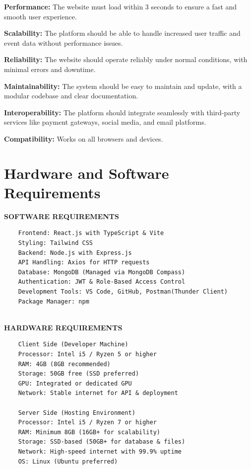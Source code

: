 \documentclass[twoside,a4paper,openright]{report} %
\begin{document}
\vspace{0.5cm} %

\textbf{Performance:} The website must load within 3 seconds to ensure a fast and smooth user         experience. 

\textbf{Scalability:} The platform should be able to handle increased user traffic and event data without
performance issues.

\textbf{Reliability:} The website should operate reliably under normal conditions, with minimal errors      and downtime. 

\textbf{Maintainability:} The system should be easy to maintain and update, with a modular codebase
and clear documentation.

\textbf{Interoperability:} The platform should integrate seamlessly with third-party services like payment
gateways, social media, and email platforms.

\textbf{Compatibility:} Works on all browsers and devices.


\section{Hardware and Software Requirements}
\textbf{SOFTWARE REQUIREMENTS}

\begin{verbatim}
	Frontend: React.js with TypeScript & Vite 
	Styling: Tailwind CSS 
	Backend: Node.js with Express.js 
	API Handling: Axios for HTTP requests
	Database: MongoDB (Managed via MongoDB Compass) 
	Authentication: JWT & Role-Based Access Control 
	Development Tools: VS Code, GitHub, Postman(Thunder Client) 
	Package Manager: npm 
	
\end{verbatim}
\raggedright
\textbf{HARDWARE REQUIREMENTS}

\begin{verbatim}
	Client Side (Developer Machine)
	Processor: Intel i5 / Ryzen 5 or higher
	RAM: 4GB (8GB recommended)
	Storage: 50GB free (SSD preferred)
	GPU: Integrated or dedicated GPU
	Network: Stable internet for API & deployment
	
	Server Side (Hosting Environment)
	Processor: Intel i5 / Ryzen 7 or higher
	RAM: Minimum 8GB (16GB+ for scalability)
	Storage: SSD-based (50GB+ for database & files)
	Network: High-speed internet with 99.9% uptime
	OS: Linux (Ubuntu preferred)
	
\end{verbatim}
\end{document}
